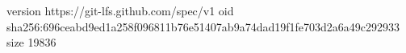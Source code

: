 version https://git-lfs.github.com/spec/v1
oid sha256:696ceabd9ed1a258f096811b76e51407ab9a74dad19f1fe703d2a6a49c292933
size 19836
